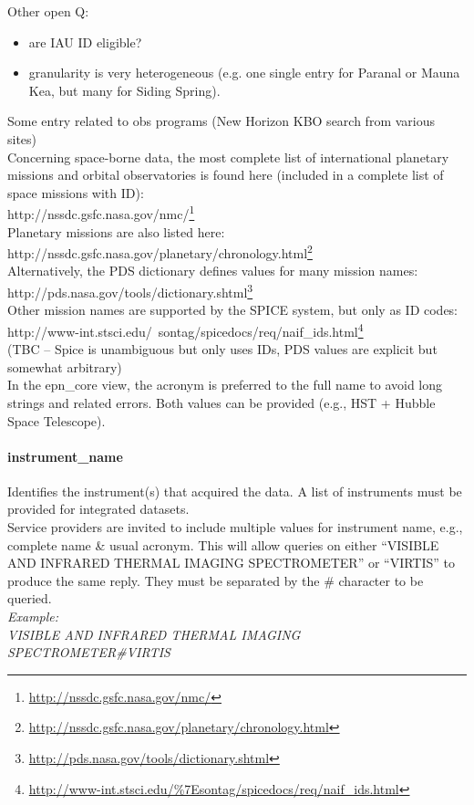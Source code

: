 \documentclass[11pt,a4paper]{ivoa}
\begin{document}
Other open Q:

\begin{itemize}
\item are IAU ID eligible?
\item granularity is very heterogeneous (e.g. one single entry for Paranal or Mauna Kea, but many for Siding Spring).
\end{itemize}

Some entry related to obs programs (New Horizon KBO search from various sites) \\ Concerning space-borne data, the most complete list of international planetary missions and orbital observatories is found here (included in a complete list of space missions with ID):\\ http://nssdc.gsfc.nasa.gov/nmc/\footnote{\url{http://nssdc.gsfc.nasa.gov/nmc/}}\\ Planetary missions are also listed here:\\ http://nssdc.gsfc.nasa.gov/planetary/chronology.html\footnote{\url{http://nssdc.gsfc.nasa.gov/planetary/chronology.html}} \\ Alternatively, the PDS dictionary defines values for many mission names:\\ http://pds.nasa.gov/tools/dictionary.shtml\footnote{\url{http://pds.nasa.gov/tools/dictionary.shtml}}\\ Other mission names are supported by the SPICE system, but only as ID codes:\\ http://www-int.stsci.edu/~sontag/spicedocs/req/naif\_ids.html\footnote{\url{http://www-int.stsci.edu/\%7Esontag/spicedocs/req/naif\_ids.html}}\\ (TBC – Spice is unambiguous but only uses IDs, PDS values are explicit but somewhat arbitrary)\\ In the epn\_core view, the acronym is preferred to the full name to avoid long strings and related errors. Both values can be provided (e.g., HST + Hubble Space Telescope).

\paragraph{instrument\_name}

Identifies the instrument(s) that acquired the data. A list of instruments must be provided for integrated datasets. \\ Service providers are invited to include multiple values for instrument name, e.g., complete name \& usual acronym. This will allow queries on either ``VISIBLE AND INFRARED THERMAL IMAGING SPECTROMETER'' or ``VIRTIS'' to produce the same reply. They must be separated by the \# character to be queried.\\\emph{\emph{Example:}}\\\emph{VISIBLE AND INFRARED THERMAL IMAGING SPECTROMETER\#VIRTIS}
\end{document}
